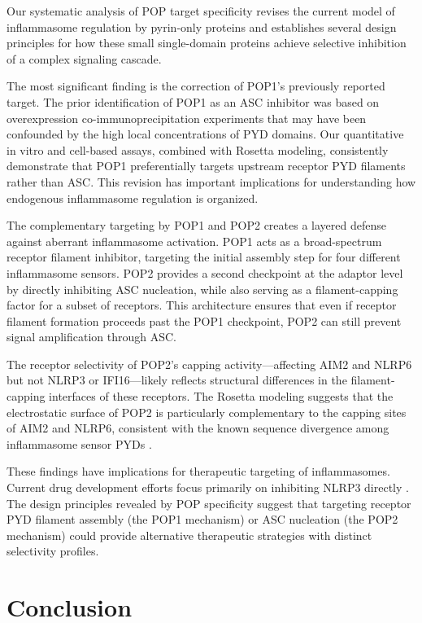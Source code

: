 \documentclass[11pt]{article}
\begin{document}
Our systematic analysis of POP target specificity revises the current model of inflammasome regulation by pyrin-only proteins and establishes several design principles for how these small single-domain proteins achieve selective inhibition of a complex signaling cascade.

The most significant finding is the correction of POP1's previously reported target. The prior identification of POP1 as an ASC inhibitor \citep{stehlik2003} was based on overexpression co-immunoprecipitation experiments that may have been confounded by the high local concentrations of PYD domains. Our quantitative in vitro and cell-based assays, combined with Rosetta modeling, consistently demonstrate that POP1 preferentially targets upstream receptor PYD filaments rather than ASC. This revision has important implications for understanding how endogenous inflammasome regulation is organized.

The complementary targeting by POP1 and POP2 creates a layered defense against aberrant inflammasome activation. POP1 acts as a broad-spectrum receptor filament inhibitor, targeting the initial assembly step for four different inflammasome sensors. POP2 provides a second checkpoint at the adaptor level by directly inhibiting ASC nucleation, while also serving as a filament-capping factor for a subset of receptors. This architecture ensures that even if receptor filament formation proceeds past the POP1 checkpoint, POP2 can still prevent signal amplification through ASC.

The receptor selectivity of POP2's capping activity---affecting AIM2 and NLRP6 but not NLRP3 or IFI16---likely reflects structural differences in the filament-capping interfaces of these receptors. The Rosetta modeling suggests that the electrostatic surface of POP2 is particularly complementary to the capping sites of AIM2 and NLRP6, consistent with the known sequence divergence among inflammasome sensor PYDs \citep{lu2015,sborgi2015}.

These findings have implications for therapeutic targeting of inflammasomes. Current drug development efforts focus primarily on inhibiting NLRP3 directly \citep{coll2015,mangan2018}. The design principles revealed by POP specificity suggest that targeting receptor PYD filament assembly (the POP1 mechanism) or ASC nucleation (the POP2 mechanism) could provide alternative therapeutic strategies with distinct selectivity profiles.

\section{Conclusion}
\end{document}
